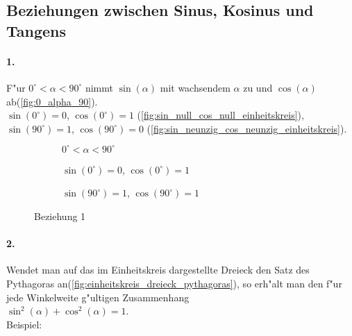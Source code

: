 \documentclass{standalone}
\begin{document}
\subsection{Beziehungen zwischen Sinus, Kosinus und Tangens}

\paragraph{1.}

\noindent F{"u}r $0^\circ < \alpha < 90^\circ$ nimmt $\sin(\alpha)$ mit wachsendem $\alpha$ zu und $\cos(\alpha)$ ab(\autoref{fig:0_alpha_90}). \\
$\sin(0^\circ) = 0$, $\cos(0^\circ) = 1$ (\autoref{fig:sin_null_cos_null_einheitskreis}), $\sin(90^\circ) = 1$, $\cos(90^\circ) = 0$ (\autoref{fig:sin_neunzig_cos_neunzig_einheitskreis}).

\newcommand{\smallImageSize}{130px} %
\begin{figure}[h!]
	\centering
	\begin{subfigure}[b]{0.3\linewidth}
		\def\svgwidth{\smallImageSize}
		
		\caption{$0^\circ < \alpha < 90^\circ$}
		\label{fig:0_alpha_90}
	\end{subfigure}
	\begin{subfigure}[b]{0.3\linewidth}
		\def\svgwidth{\smallImageSize}
		
		\caption{$\sin(0^\circ) = 0$, $\cos(0^\circ) = 1$}
		\label{fig:sin_null_cos_null_einheitskreis}
	\end{subfigure}
	\begin{subfigure}[b]{0.3\linewidth}
		\def\svgwidth{\smallImageSize}
		
		\caption{$\sin(90^\circ) = 1$, $\cos(90^\circ) = 1$}
		\label{fig:sin_neunzig_cos_neunzig_einheitskreis}
	\end{subfigure}
	\caption{Beziehung 1}
	\label{fig:beziehung_eins}
\end{figure}

\newpage

\paragraph{2.}

Wendet man auf das im Einheitskreis dargestellte Dreieck den Satz des Pythagoras an(\autoref{fig:einheitskreis_dreieck_pythagoras}), so erh{"a}lt man den f{"u}r jede Winkelweite g{"u}ltigen Zusammenhang \\
$\sin^2(\alpha) + \cos^2(\alpha) = 1$. \\
Beispiel:
\end{document}
